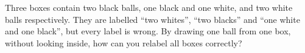 Three boxes contain two black balls, one black and one white, and two white balls respectively. They are labelled ``two whites'', ``two blacks'' and ``one white and one black'', but every label is wrong. By drawing one ball from one box, without looking inside, how can you relabel all boxes correctly?
